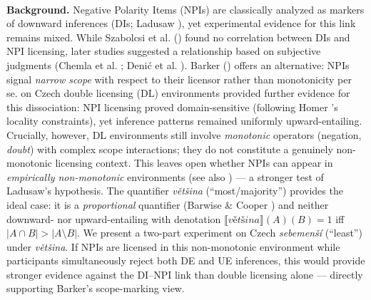 \documentclass[12pt, a4]{article}
\begin{document}


\begin{center}{\vspace{-2ex}{\bf  Scope Over Monotonicity: NPI Licensing with Czech “majority”}}\\
\end{center}
\vspace{-1ex}
\noindent \textbf{Background.} Negative Polarity Items (NPIs) are classically analyzed as markers of downward inferences (DIs; Ladusaw \citeyear{ladusaw1979polarity}), yet experimental evidence for this link remains mixed. While Szabolcsi et al. (\citeyear{szabolcsi2008effect}) found no correlation between DIs and NPI licensing, later studies suggested a relationship based on subjective judgments (Chemla et al. \citeyear{chemla2011modularity}; Denić et al. \citeyear{denic2021influence}). Barker (\citeyear{barker2018negative}) offers an alternative: NPIs signal \textit{narrow scope} with respect to their licensor rather than monotonicity per se. \citet{docekal-chumchalova-sub30} on Czech double licensing (DL) environments provided further evidence for this dissociation: NPI licensing proved domain-sensitive (following Homer \citeyear{homer2021domains}'s locality constraints), yet inference patterns remained uniformly upward-entailing. Crucially, however, DL environments still involve \textit{monotonic} operators (negation, \textit{doubt}) with complex scope interactions; they do not constitute a genuinely non-monotonic licensing context. This leaves open whether NPIs can appear in \textit{empirically non-monotonic} environments (see also \citet{alexandropoulou2020there}) — a stronger test of Ladusaw's hypothesis. The quantifier \textit{většina} (“most/majority”) provides the ideal case: it is a \textit{proportional} quantifier (Barwise \& Cooper \citeyear{barwise-cooper1981}) and neither downward- nor upward-entailing with denotation $\llbracket\textit{většina}\rrbracket(A)(B)=1$ iff $|A\cap B|>|A\setminus B|$. We present a two-part experiment on Czech \textit{sebemenší} (“least”) under \textit{většina}. If NPIs are licensed in this non-monotonic environment while participants simultaneously reject both DE and UE inferences, this would provide stronger evidence against the DI–NPI link than double licensing alone — directly supporting Barker's scope-marking view.\vspace{-0.5mm}
\end{document}
